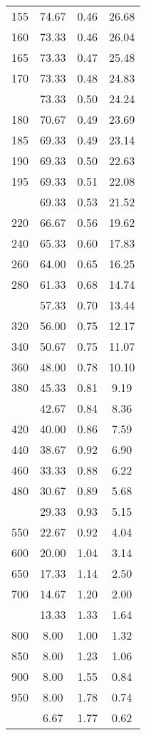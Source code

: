 \begin{table}[ht]
\begin{tabular}{lccc}
  155 & 74.67 & 0.46 & 26.68 \\ 
  160 & 73.33 & 0.46 & 26.04 \\ 
  165 & 73.33 & 0.47 & 25.48 \\ 
  170 & 73.33 & 0.48 & 24.83 \\ 
   \addlinespace
175 & 73.33 & 0.50 & 24.24 \\ 
  180 & 70.67 & 0.49 & 23.69 \\ 
  185 & 69.33 & 0.49 & 23.14 \\ 
  190 & 69.33 & 0.50 & 22.63 \\ 
  195 & 69.33 & 0.51 & 22.08 \\ 
   \addlinespace
200 & 69.33 & 0.53 & 21.52 \\ 
  220 & 66.67 & 0.56 & 19.62 \\ 
  240 & 65.33 & 0.60 & 17.83 \\ 
  260 & 64.00 & 0.65 & 16.25 \\ 
  280 & 61.33 & 0.68 & 14.74 \\ 
   \addlinespace
300 & 57.33 & 0.70 & 13.44 \\ 
  320 & 56.00 & 0.75 & 12.17 \\ 
  340 & 50.67 & 0.75 & 11.07 \\ 
  360 & 48.00 & 0.78 & 10.10 \\ 
  380 & 45.33 & 0.81 & 9.19 \\ 
   \addlinespace
400 & 42.67 & 0.84 & 8.36 \\ 
  420 & 40.00 & 0.86 & 7.59 \\ 
  440 & 38.67 & 0.92 & 6.90 \\ 
  460 & 33.33 & 0.88 & 6.22 \\ 
  480 & 30.67 & 0.89 & 5.68 \\ 
   \addlinespace
500 & 29.33 & 0.93 & 5.15 \\ 
  550 & 22.67 & 0.92 & 4.04 \\ 
  600 & 20.00 & 1.04 & 3.14 \\ 
  650 & 17.33 & 1.14 & 2.50 \\ 
  700 & 14.67 & 1.20 & 2.00 \\ 
   \addlinespace
750 & 13.33 & 1.33 & 1.64 \\ 
  800 & 8.00 & 1.00 & 1.32 \\ 
  850 & 8.00 & 1.23 & 1.06 \\ 
  900 & 8.00 & 1.55 & 0.84 \\ 
  950 & 8.00 & 1.78 & 0.74 \\ 
   \addlinespace
1000 & 6.67 & 1.77 & 0.62 \\ 
   \bottomrule
\end{tabular}
\end{table}
